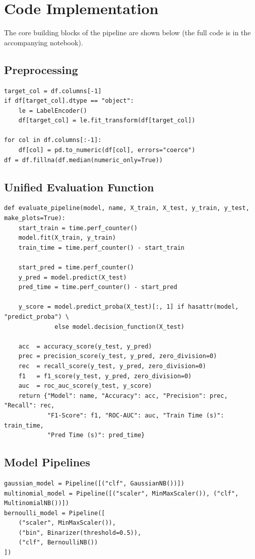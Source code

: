 \documentclass[12pt,a4paper]{article}
\begin{document}
\section{Code Implementation}
The core building blocks of the pipeline are shown below (the full code is in the accompanying notebook).
 
\subsection*{Preprocessing}
\begin{lstlisting}
target_col = df.columns[-1]
if df[target_col].dtype == "object":
    le = LabelEncoder()
    df[target_col] = le.fit_transform(df[target_col])
 
for col in df.columns[:-1]:
    df[col] = pd.to_numeric(df[col], errors="coerce")
df = df.fillna(df.median(numeric_only=True))
\end{lstlisting}
 
\subsection*{Unified Evaluation Function}
\begin{lstlisting}
def evaluate_pipeline(model, name, X_train, X_test, y_train, y_test, make_plots=True):
    start_train = time.perf_counter()
    model.fit(X_train, y_train)
    train_time = time.perf_counter() - start_train
 
    start_pred = time.perf_counter()
    y_pred = model.predict(X_test)
    pred_time = time.perf_counter() - start_pred
 
    y_score = model.predict_proba(X_test)[:, 1] if hasattr(model, "predict_proba") \
              else model.decision_function(X_test)
 
    acc  = accuracy_score(y_test, y_pred)
    prec = precision_score(y_test, y_pred, zero_division=0)
    rec  = recall_score(y_test, y_pred, zero_division=0)
    f1   = f1_score(y_test, y_pred, zero_division=0)
    auc  = roc_auc_score(y_test, y_score)
    return {"Model": name, "Accuracy": acc, "Precision": prec, "Recall": rec,
            "F1-Score": f1, "ROC-AUC": auc, "Train Time (s)": train_time,
            "Pred Time (s)": pred_time}
\end{lstlisting}
 
\subsection*{Model Pipelines}
\begin{lstlisting}
gaussian_model = Pipeline([("clf", GaussianNB())])
multinomial_model = Pipeline([("scaler", MinMaxScaler()), ("clf", MultinomialNB())])
bernoulli_model = Pipeline([
    ("scaler", MinMaxScaler()),
    ("bin", Binarizer(threshold=0.5)),
    ("clf", BernoulliNB())
])
\end{lstlisting}
 
\end{document}
